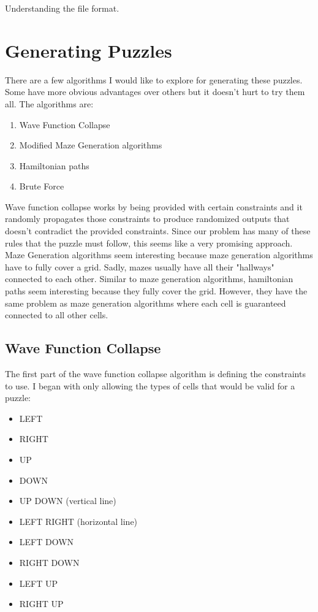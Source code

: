\documentclass[10pt,a4paper,openany]{article}
\begin{document}
Understanding the file format.

\section{Generating Puzzles}

There are a few algorithms I would like to explore for generating these puzzles. Some have more obvious advantages over others but it doesn't hurt to try them all. The algorithms are:
\begin{enumerate}
  \item Wave Function Collapse
  \item Modified Maze Generation algorithms
  \item Hamiltonian paths
  \item Brute Force
\end{enumerate}

Wave function collapse works by being provided with certain constraints and it randomly propagates those constraints to produce randomized outputs that doesn't contradict the provided constraints.
Since our problem has many of these rules that the puzzle must follow, this seems like a very promising approach. 
Maze Generation algorithms seem interesting because maze generation algorithms have to fully cover a grid. 
Sadly, mazes usually have all their "hallways" connected to each other. Similar to maze generation algorithms, hamiltonian paths seem
interesting because they fully cover the grid. However, they have the same problem as maze generation algorithms where each cell is guaranteed connected to all other cells.

\subsection{Wave Function Collapse}

The first part of the wave function collapse algorithm is defining the constraints to use. 
I began with only allowing the types of cells that would be valid for a puzzle:

\begin{itemize}
  \item LEFT
  \item RIGHT
  \item UP
  \item DOWN
  \item UP DOWN (vertical line)
  \item LEFT RIGHT (horizontal line)
  \item LEFT DOWN
  \item RIGHT DOWN
  \item LEFT UP
  \item RIGHT UP
\end{itemize}
\end{document}
